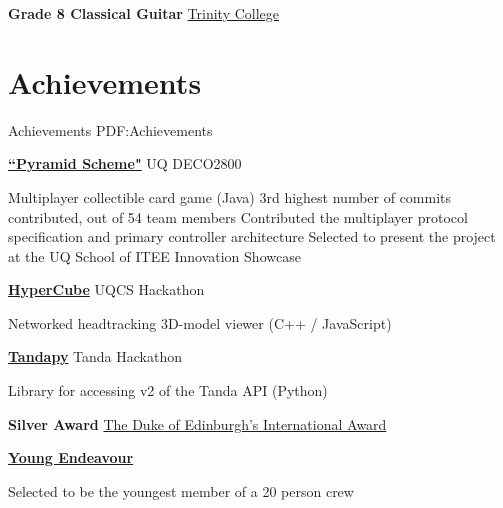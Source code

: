 \documentclass[a4paper,10pt,oneside]{article}
\begin{document}
\begin{body}

\textbf{Grade 8 Classical Guitar}
\href{http://www.trinitycollege.com/}{Trinity College}
\hfill {}






\section
{Achievements}
{Achievements}
{PDF:Achievements}


\href{https://github.com/UQdeco2800/deco2800-2016-pyramidscheme}{\textbf{``Pyramid Scheme"}} UQ DECO2800 \hfill {}
\begin{detail}
	\BulletItem Multiplayer collectible card game (Java)
	\BulletItem 3rd highest number of commits contributed, out of 54 team members
	\BulletItem Contributed the multiplayer protocol specification and primary controller architecture
	\BulletItem Selected to present the project at the UQ School of ITEE Innovation Showcase
\end{detail}

\EntryGap

\href{https://github.com/Chrischar/HyperCube}{\textbf{HyperCube}} UQCS Hackathon \hfill {}
\begin{detail}
Networked headtracking 3D-model viewer (C++ / JavaScript)
\end{detail}

\EntryGap

\href{https://github.com/Baralabite/Tandapy}{\textbf{Tandapy}} Tanda Hackathon \hfill {}
\begin{detail}
Library for accessing v2 of the Tanda API (Python)
\end{detail}

\EntryGap

\textbf{Silver Award}
\href{http://www.dukeofed.com.au/}{The Duke of Edinburgh’s International Award}
\hfill {}

\EntryGap

\href{https://www.youngendeavour.gov.au/}{\textbf{Young Endeavour}} \hfill {}
\begin{detail}
Selected to be the youngest member of a 20 person crew
\end{detail}


\end{body}
\end{document}
